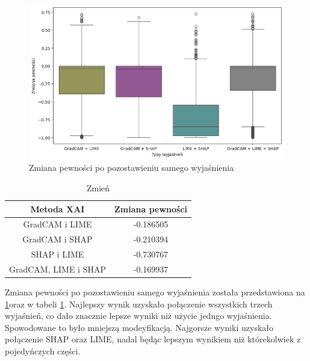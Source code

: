 \begin{figure}[h]
	\centering\includegraphics[width=.9\textwidth]{img/combine_confidence_exp_or}
	\caption{Zmiana pewności po pozostawieniu samego wyjaśnienia}  \label{rys:combineandconfidenceor}
\end{figure}
\begin{table}[h]
	\centering
	\begin{tabular}{|c|c|}
		\hline
		\textbf{Metoda XAI}  & Zmiana pewności \\
		\hline
		GradCAM i LIME       & -0.186505       \\
		\hline
		GradCAM i SHAP       & -0.210394       \\
		\hline
		SHAP i LIME          & -0.730767       \\
		\hline
		GradCAM, LIME i SHAP & -0.169937       \\
		\hline
	\end{tabular}
	\caption{Zmień}
	\label{tab:combineandconfidenceor}
\end{table}
Zmiana pewności po pozostawieniu samego wyjaśnienia została przedstawiona na \ref{rys:combineandconfidenceor}oraz w tabeli \ref{tab:combineandconfidenceor}.
Najlepszy wynik uzyskało połączenie wszystkich trzech wyjaśnień, co dało znacznie lepsze wyniki niż użycie jedngo wyjaśnienia.
Spowodowane to było mniejszą modeyfikacją.
Najgorsze wyniki uzyskało połączenie SHAP oraz LIME, nadal będąc lepszym wynikiem niż którekolwiek z pojedyńczych części.
\vspace{1cm}

